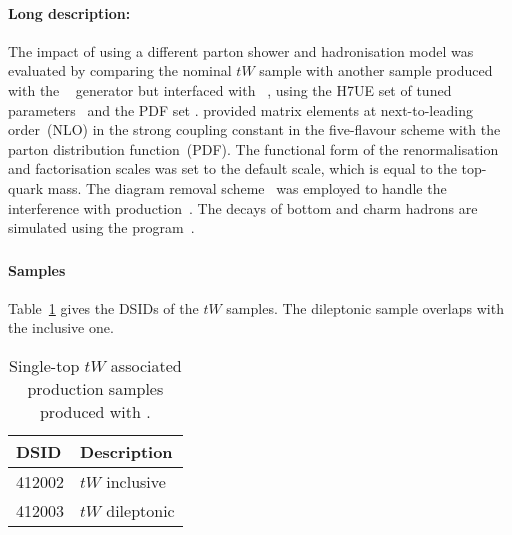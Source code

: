\paragraph{Long description:}

The impact of using a different parton shower and hadronisation model was evaluated
by comparing the nominal $tW$ sample with another sample produced with the
\POWHEGBOX[v2]~\cite{Re:2010bp,Nason:2004rx,Frixione:2007vw,Alioli:2010xd}
generator but interfaced with \HERWIG[7.04]~\cite{Bahr:2008pv,Bellm:2015jjp},
using the H7UE set of tuned parameters~\cite{Bellm:2015jjp} and the
\MMHT[lo] PDF set \cite{Harland-Lang:2014zoa}.
\POWHEGBOX provided matrix elements at next-to-leading order~(NLO) in the 
strong coupling constant \alphas in the five-flavour scheme with the 
\NNPDF[3.0nlo]~\cite{Ball:2014uwa} parton distribution function~(PDF).  
The functional form of the renormalisation and factorisation scales was set to 
the default scale, which is equal to the top-quark mass.  The diagram removal
scheme~\cite{Frixione:2008yi} was employed to handle the interference
with \ttbar production~\cite{ATL-PHYS-PUB-2016-020}.  The decays of bottom
and charm hadrons are simulated using the \EVTGEN[1.6.0]
program~\cite{Lange:2001uf}.

\subsubsection[MadGraph5\_aMC@NLO+Pythia8]{\MGNLOPY[8]}
\label{subsubsec:tW_aMCP8}

\paragraph{Samples}

Table~\ref{tab:tW_aMCP8} gives the DSIDs of the $tW$ \MGNLOPY[8] samples.
The dileptonic sample overlaps with the inclusive one.
\begin{table}[htbp]
\begin{center}
\caption{Single-top $tW$ associated production samples produced with \MGNLOPY[8].} 
\label{tab:tW_aMCP8}
\begin{tabular}{ l | l }
\hline
DSID & Description \\
\hline
412002 & $tW$ inclusive \\
412003 & $tW$ dileptonic \\
\hline
\end{tabular}
\end{center}
\end{table}

